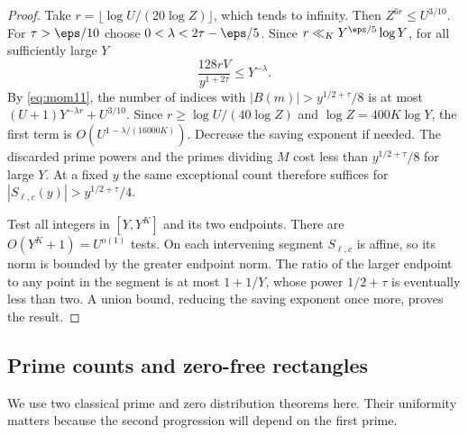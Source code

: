 \documentclass[a4paper,11pt]{article}
\theoremstyle{definition}
\theoremstyle{remark}
\numberwithin{equation}{section}
\begin{document}
\begin{proof}
Take \(r=\lfloor\log U/(20\log Z)\rfloor\), which tends to infinity. Then \(Z^{6r}\le U^{3/10}\). For \(\tau>\eps/10\) choose \(0<\lambda<2\tau-\eps/5\). Since \(r\ll_{K}Y^{\eps/5}\log Y\), for all sufficiently large \(Y\)
\[
       \frac{128rV}{y^{1+2\tau}}\le Y^{-\lambda}.
\]
By \eqref{eq:mom11}, the number of indices with \(|B(m)|>y^{1/2+\tau}/8\) is at most \((U+1)Y^{-\lambda r}+U^{3/10}\). Since \(r\ge \log U/(40\log Z)\) and \(\log Z=400K\log Y\), the first term is \(O(U^{1-\lambda/(16000K)})\). Decrease the saving exponent if needed. The discarded prime powers and the primes dividing \(M\) cost less than \(y^{1/2+\tau}/8\) for large \(Y\). At a fixed \(y\) the same exceptional count therefore suffices for \(|S_{\ell,c}(y)|>y^{1/2+\tau}/4\).

Test all integers in \([Y,Y^K]\) and its two endpoints. There are \(O(Y^K+1)=U^{o(1)}\) tests. On each intervening segment \(S_{\ell,c}\) is affine, so its norm is bounded by the greater endpoint norm. The ratio of the larger endpoint to any point in the segment is at most \(1+1/Y\), whose power \(1/2+\tau\) is eventually less than two. A union bound, reducing the saving exponent once more, proves the result.
\end{proof}

\subsection{Prime counts and zero-free rectangles}\label{nav:I-18}
We use two classical prime and zero distribution theorems here. Their uniformity matters because the second progression will depend on the first prime.
\end{document}
